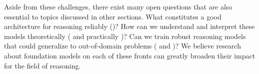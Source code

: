 Aside from these challenges, there exist many open questions that are also essential to topics discussed in other sections. What constitutes a good architecture for reasoning reliably ()? How can we understand and interpret these models theoretically ( and practically )? Can we train robust reasoning models that could generalize to out-of-domain problems ( and )? We believe research about foundation models on each of these fronts can greatly broaden their impact for the field of reasoning.
